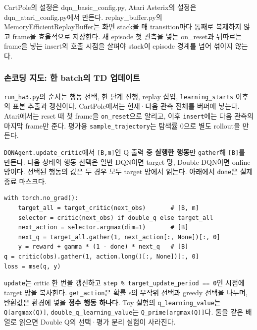 \documentclass[11pt,a4paper]{article}
\begin{document}
CartPole의 설정은 dqn\_basic\_config.py, Atari Asterix의 설정은 dqn\_atari\_config.py에서 만든다. replay\_buffer.py의 MemoryEfficientReplayBuffer는 화면 stack을 매 transition마다 통째로 복제하지 않고 frame을 효율적으로 저장한다. 새 episode 첫 관측을 넣는 on\_reset과 뒤따르는 frame을 넣는 insert의 호출 시점을 살펴야 stack이 episode 경계를 넘어 섞이지 않는다.\par

\subsubsection{손코딩 지도: 한 batch의 TD 업데이트}

\texttt{run\_\allowbreak{}hw3.\allowbreak{}py}의 순서는 행동 선택, 한 단계 진행, replay 삽입, \texttt{learning\_\allowbreak{}starts} 이후의 표본 추출과 갱신이다. CartPole에서는 현재·다음 관측 전체를 버퍼에 넣는다. Atari에서는 reset 때 첫 frame을 \texttt{on\_\allowbreak{}reset}으로 알리고, 이후 \texttt{insert}에는 다음 관측의 마지막 frame만 준다. 평가용 \texttt{sample\_\allowbreak{}trajectory}는 탐색률 0으로 별도 rollout을 만든다.\par

\texttt{DQNAgent.\allowbreak{}update\_\allowbreak{}critic}에서 \texttt{[B,\allowbreak{}m]}인 Q 출력 중 \textbf{실행한 행동}만 \texttt{gather}해 \texttt{[B]}를 만든다. 다음 상태의 행동 선택은 일반 DQN이면 target 망, Double DQN이면 online 망이다. 선택된 행동의 값은 두 경우 모두 target 망에서 읽는다. 아래에서 \texttt{done}은 실제 종료 마스크다.\par

\begin{verbatim}
with torch.no_grad():
    target_all = target_critic(next_obs)       # [B, m]
    selector = critic(next_obs) if double_q else target_all
    next_action = selector.argmax(dim=1)       # [B]
    next_q = target_all.gather(1, next_action[:, None])[:, 0]
    y = reward + gamma * (1 - done) * next_q   # [B]
q = critic(obs).gather(1, action.long()[:, None])[:, 0]
loss = mse(q, y)
\end{verbatim}

\texttt{update}는 critic 한 번을 갱신하고 \texttt{step \% target\_\allowbreak{}update\_\allowbreak{}period == 0}인 시점에 target 망을 복사한다. \texttt{get\_\allowbreak{}action}은 확률 $\epsilon$의 무작위 선택과 greedy 선택을 나누며, 반환값은 환경에 넣을 \textbf{정수 행동 하나}다. Toy 실험의 \texttt{q\_\allowbreak{}learning\_\allowbreak{}value}는 \texttt{Q[argmax(Q)]}, \texttt{double\_\allowbreak{}q\_\allowbreak{}learning\_\allowbreak{}value}는 \texttt{Q\_\allowbreak{}prime[argmax(Q)]}다. 둘을 같은 배열로 읽으면 Double Q의 선택·평가 분리 실험이 사라진다.\par
\end{document}
